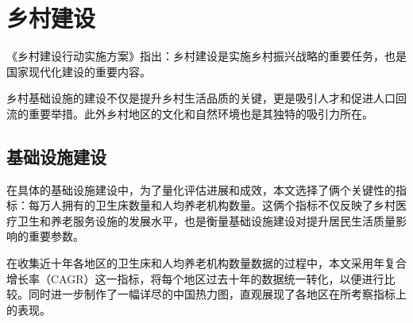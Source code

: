 \chapter{乡村建设}
\label{chapter:basic}

《乡村建设行动实施方案》指出：乡村建设是实施乡村振兴战略的重要任务，也是国家现代化建设的重要内容。

乡村基础设施的建设不仅是提升乡村生活品质的关键，更是吸引人才和促进人口回流的重要举措。此外乡村地区的文化和自然环境也是其独特的吸引力所在。

\section{基础设施建设}

在具体的基础设施建设中，为了量化评估进展和成效，本文选择了俩个关键性的指标：每万人拥有的卫生床数量和人均养老机构数量。这俩个指标不仅反映了乡村医疗卫生和养老服务设施的发展水平，也是衡量基础设施建设对提升居民生活质量影响的重要参数。

在收集近十年各地区的卫生床和人均养老机构数量数据的过程中\cite{heywhale-dataset}，本文采用年复合增长率（CAGR）这一指标，将每个地区过去十年的数据统一转化，以便进行比较。同时进一步制作了一幅详尽的中国热力图，直观展现了各地区在所考察指标上的表现。

